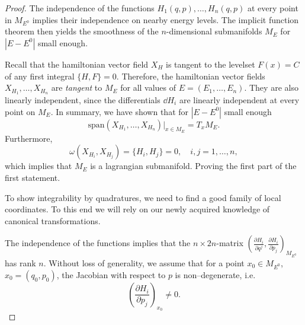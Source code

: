 \documentclass[english,fontsize=11pt,paper=b5]{scrbook}
\numberwithin{equation}{chapter}
\theoremstyle{definition}
\begin{document}
      \begin{proof}
        The independence of the functions $H_1(q,p), \ldots, H_n(q,p)$ at every point in $M_{E^0}$ implies their independence on nearby energy levels. The implicit function theorem then yields the smoothness of the $n$-dimensional submanifolds $M_E$ for $|E-E^0|$ small enough.

        Recall that the hamiltonian vector field $X_H$ is tangent to the levelset $F(x)=C$ of any first integral $\big\{H,F\big\} = 0$. Therefore, the hamiltonian vector fields $X_{H_1}, \ldots, X_{H_n}$ are \emph{tangent} to $M_E$ for all values of $E=(E_1,\ldots, E_n)$.
        They are also linearly independent, since the differentials $\dd H_i$ are linearly independent at every point on $M_E$.
        In summary, we have shown that for $|E-E^0|$ small enough
        \begin{equation}
          \mathrm{span}(X_{H_1}, \ldots, X_{H_n}) \big|_{x\in M_E} = T_x M_E.
        \end{equation}
        Furthermore,
        \begin{equation}
          \omega(X_{H_i}, X_{H_j}) = \big\{H_i, H_j\big\} =0, \quad i,j=1,\ldots,n,
        \end{equation}
        which implies that $M_E$ is a lagrangian submanifold. Proving the first part of the first statement.

        To show integrability by quadratures, we need to find a good family of local coordinates. To this end we will rely on our newly acquired knowledge of canonical transformations.

        The independence of the functions implies that the $n\times 2n$-matrix
        $\left(
          \frac{\partial H_i}{\partial q^j},
          \frac{\partial H_i}{\partial p_j}
        \right)_{M_{E^0}}$
        has rank $n$. Without loss of generality, we assume that for a point $x_0 \in M_{E^0}$, $x_0 =(q_0,p_0)$, the Jacobian with respect to $p$ is non--degenerate, i.e.
        \begin{equation}\label{eq:nondegHip}
          \left(
            \frac{\partial H_i}{\partial p_j}
          \right)_{x_0} \neq 0.
        \end{equation}


\end{proof}
\end{document}
